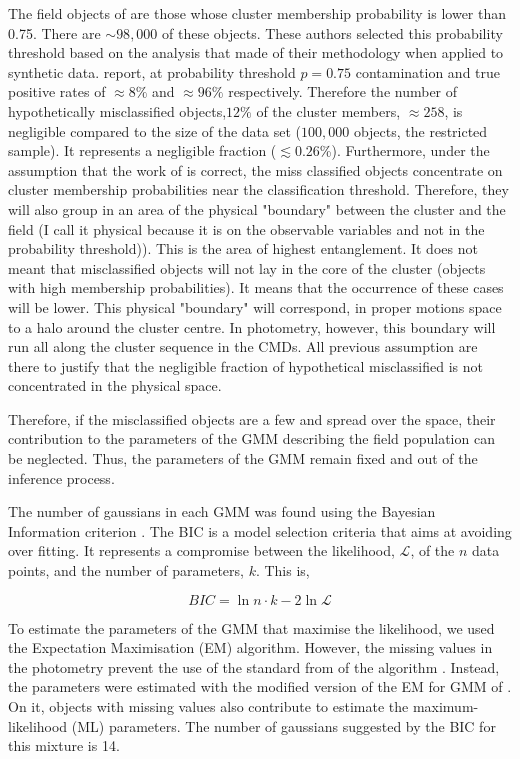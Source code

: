 The field objects of \citet{Bouy2015} are those whose cluster membership probability is lower than 0.75. There are $\sim 98,000$ of these objects. These authors selected this probability threshold based on the analysis that \citet{Sarro2014} made of their methodology when applied to synthetic data. \citet{Sarro2014} report, at probability threshold $p=0.75$ contamination and true positive rates of $\approx 8\%$ and $ \approx96\%$ respectively. Therefore the number of hypothetically misclassified objects,$12\%$ of the cluster members, $\approx 258 $, is negligible compared to the size of the data set ($100,000$ objects, the restricted sample). It represents a negligible fraction ($ \lesssim0.26$\%). Furthermore, under the assumption that the work of \citet{Sarro2014} is correct, the miss classified objects concentrate on cluster membership probabilities near the classification threshold. Therefore, they will also group in an area of the physical "boundary" between the cluster and the field (I call it physical because it is on the observable variables and not in the probability threshold)). This is the area of highest entanglement. It does not meant that misclassified objects will not lay in the core of the cluster (objects with high membership probabilities). It means that the occurrence of these cases will be lower.  This physical "boundary" will correspond, in proper motions space to a halo around the cluster centre. In photometry, however, this boundary will run all along the cluster sequence in the CMDs. All previous assumption are there to justify that the negligible fraction of hypothetical misclassified is not concentrated in the physical space. 

Therefore, if the misclassified objects are a few and spread over the space, their contribution to the parameters of the GMM describing the field population can be neglected. Thus, the parameters of the GMM remain fixed and out of the inference process. 

The number of gaussians in each GMM was found using the Bayesian Information criterion \cite[BIC,][]{Schwarz1978}. The BIC is a model selection criteria that aims at avoiding over fitting. It represents a compromise between the likelihood, $\mathcal{L}$, of the $n$ data points, and the number of parameters, $k$. This is,

\begin{equation}
\label{eq:BIC}
BIC = \ln{n}\cdot k - 2 \ln{\mathcal{L}}
\end{equation}

To estimate the parameters of the GMM that maximise the likelihood, we used the Expectation Maximisation (EM) algorithm. However, the missing values in the photometry prevent the use of the standard from of the algorithm \cite[see for example Chapter 9 of][]{Bishop2006}.
Instead, the parameters were estimated with the modified version of the EM for GMM of \citet{McMichael1996}. On it, objects with missing values also contribute to estimate the maximum-likelihood (ML) parameters. The number of gaussians suggested by the BIC for this mixture is 14. 

